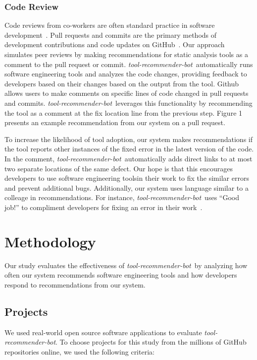 \documentclass[sigconf,review,anonymous]{acmart}
\newcommand{\tool}{\textsl{tool-recommender-bot}}
\begin{document}
\subsubsection{Code Review}

Code reviews from co-workers are often standard practice in software development~\cite{CBirdCodeReviewingTrenches}. Pull requests and commits are the primary methods of development contributions and code updates on GitHub~\cite{PullRequestReview}. Our approach simulates peer reviews by making recommendations for static analysis tools as a comment to the pull request or commit. \tool~automatically runs software engineering tools and analyzes the code changes, providing feedback to developers based on their changes based on the output from the tool. Github allows users to make comments on specific lines of code changed in pull requests and commits. \tool~leverages this functionality by recommending the tool as a comment at the fix location line from the previous step. Figure 1 presents an example recommendation from our system on a pull request. %

To increase the likelihood of tool adoption, our system makes recommendations if the tool reports other instances of the fixed error in the latest version of the code. In the comment, \tool~automatically adds direct links to at most two separate locations of the same defect. Our hope is that this encourages developers to use software engineering toolsin their work to fix the similar errors and prevent additional bugs. Additionally, our system uses language similar to a colleage in recommendations. For instance, \tool~uses ``Good job!'' to compliment developers for fixing an error in their work~\cite{?}.

\section{Methodology}

Our study evaluates the effectiveness of \tool~by analyzing how often our system recommends software engineering tools and how developers respond to recommendations from our system.

\subsection{Projects}

We used real-world open source software applications to evaluate \tool. To choose projects for this study from the millions of GitHub repositories online, we used the following criteria:
\end{document}
